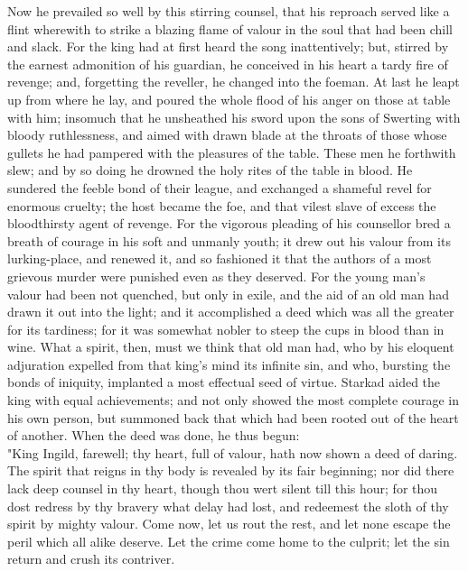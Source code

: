 \documentclass[10pt,a4paper]{report}
\begin{document}
Now he prevailed so well by this stirring counsel, that his reproach served like a flint wherewith to strike a blazing flame of valour in the soul that had been chill and slack. For the king had at first heard the song inattentively; but, stirred by the earnest admonition of his guardian, he conceived in his heart a tardy fire of revenge; and, forgetting the reveller, he changed into the foeman. At last he leapt up from where he lay, and poured the whole flood of his anger on those at table with him; insomuch that he unsheathed his sword upon the sons of Swerting with bloody ruthlessness, and aimed with drawn blade at the throats of those whose gullets he had pampered with the pleasures of the table. These men he forthwith slew; and by so doing he drowned the holy rites of the table in blood. He sundered the feeble bond of their league, and exchanged a shameful revel for enormous cruelty; the host became the foe, and that vilest slave of excess the bloodthirsty agent of revenge. For the vigorous pleading of his counsellor bred a breath of courage in his soft and unmanly youth; it drew out his valour from its lurking-place, and renewed it, and so fashioned it that the authors of a most grievous murder were punished even as they deserved. For the young man's valour had been not quenched, but only in exile, and the aid of an old man had drawn it out into the light; and it accomplished a deed which was all the greater for its tardiness; for it was somewhat nobler to steep the cups in blood than in wine. What a spirit, then, must we think that old man had, who by his eloquent adjuration expelled from that king's mind its infinite sin, and who, bursting the bonds of iniquity, implanted a most effectual seed of virtue. Starkad aided the king with equal achievements; and not only showed the most complete courage in his own person, but summoned back that which had been rooted out of the heart of another. When the deed was done, he thus begun:\\

"King Ingild, farewell; thy heart, full of valour, hath now shown a deed of daring. The spirit that reigns in thy body is revealed by its fair beginning; nor did there lack deep counsel in thy heart, though thou wert silent till this hour; for thou dost redress by thy bravery what delay had lost, and redeemest the sloth of thy spirit by mighty valour. Come now, let us rout the rest, and let none escape the peril which all alike deserve. Let the crime come home to the culprit; let the sin return and crush its contriver.\\
\end{document}
